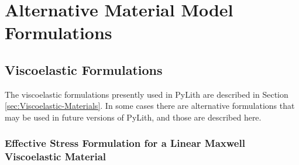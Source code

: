 
\chapter{\label{cha:Alternative-Formulations}Alternative Material Model Formulations}


\section{\label{sec:ViscoelasticFormulations}Viscoelastic Formulations}

The viscoelastic formulations presently used in PyLith are described
in Section \ref{sec:Viscoelastic-Materials}. In some cases there
are alternative formulations that may be used in future versions of
PyLith, and those are described here.


\subsection{\label{sub:Effective-Stress-Formulation-Maxwell}Effective Stress
Formulation for a Linear Maxwell Viscoelastic Material}


